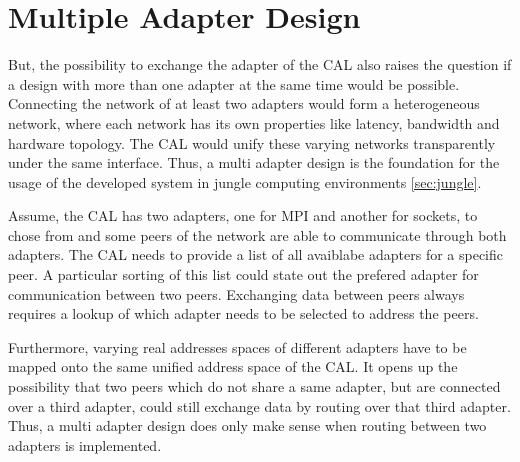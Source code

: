\section*{Multiple Adapter Design}

But, the possibility to exchange the adapter of the CAL also raises
the question if a design with more than one adapter at the same time
would be possible. Connecting the network of at least two adapters
would form a heterogeneous network, where each network has its own
properties like latency, bandwidth and hardware topology. The CAL
would unify these varying networks transparently under the same
interface. Thus, a multi adapter design is the foundation for the
usage of the developed system in jungle computing environments
\ref{sec:jungle}.





Assume, the CAL has two adapters, one for MPI and another for sockets,
to chose from and some peers of the network are able to communicate
through both adapters.  The CAL needs to provide a list of all
avaiblabe adapters for a specific peer. A particular sorting of this
list could state out the prefered adapter for communication between
two peers. Exchanging data between peers always requires a lookup of
which adapter needs to be selected to address the peers.





Furthermore, varying real addresses spaces of different adapters have
to be mapped onto the same unified address space of the CAL.  It opens
up the possibility that two peers which do not share a same adapter,
but are connected over a third adapter, could still exchange data by
routing over that third adapter. Thus, a multi adapter design does
only make sense when routing between two adapters is implemented.

